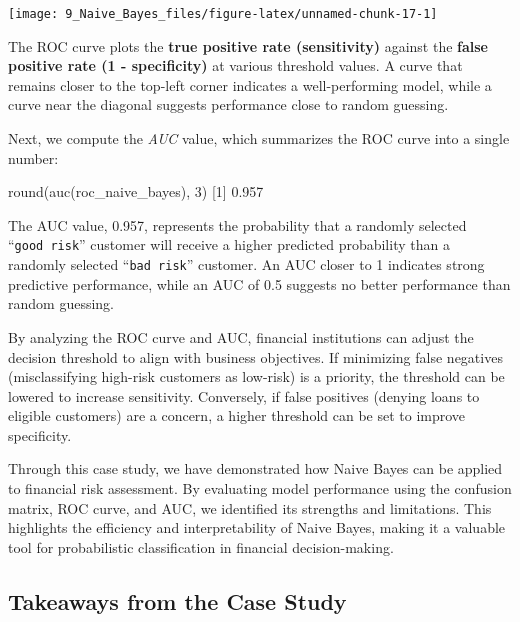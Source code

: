 \documentclass[
  11pt,
]{book}
\makeatletter
\newenvironment{Shaded}{}{}
\newcommand{\DecValTok}[1]{#1}
\newcommand{\FloatTok}[1]{#1}
\newcommand{\FunctionTok}[1]{#1}
\newcommand{\NormalTok}[1]{#1}
\newenvironment{kframe}{%
\medskip{}
\setlength{\fboxsep}{.8em}
 \def\at@end@of@kframe{}%
 \ifinner\ifhmode%
  \def\at@end@of@kframe{\end{minipage}}%
  \begin{minipage}{\columnwidth}%
 \fi\fi%
 \def\FrameCommand##1{\hskip\@totalleftmargin \hskip-\fboxsep
 \colorbox{shadecolor}{##1}\hskip-\fboxsep
     \hskip-\linewidth \hskip-\@totalleftmargin \hskip\columnwidth}%
 \MakeFramed {\advance\hsize-\width
   \@totalleftmargin\z@ \linewidth\hsize
   \@setminipage}}%
 {\par\unskip\endMakeFramed%
 \at@end@of@kframe}
\renewenvironment{Shaded}{\begin{kframe}}{\end{kframe}}
\theoremstyle{definition}
\theoremstyle{definition}
\theoremstyle{definition}
\theoremstyle{definition}
\theoremstyle{remark}
\makeatother
\begin{document}
\begin{center}\texttt{[image: 9\_Naive\_Bayes\_files/figure-latex/unnamed-chunk-17-1]} \end{center}

The ROC curve plots the \textbf{true positive rate (sensitivity)} against the \textbf{false positive rate (1 - specificity)} at various threshold values. A curve that remains closer to the top-left corner indicates a well-performing model, while a curve near the diagonal suggests performance close to random guessing.

Next, we compute the \emph{AUC} value, which summarizes the ROC curve into a single number:

\begin{Shaded}
\begin{Highlighting}[]
\FunctionTok{round}\NormalTok{(}\FunctionTok{auc}\NormalTok{(roc\_naive\_bayes), }\DecValTok{3}\NormalTok{)}
\NormalTok{   [}\DecValTok{1}\NormalTok{] }\FloatTok{0.957}
\end{Highlighting}
\end{Shaded}

The AUC value, 0.957, represents the probability that a randomly selected ``\texttt{good\ risk}'' customer will receive a higher predicted probability than a randomly selected ``\texttt{bad\ risk}'' customer. An AUC closer to 1 indicates strong predictive performance, while an AUC of 0.5 suggests no better performance than random guessing.

By analyzing the ROC curve and AUC, financial institutions can adjust the decision threshold to align with business objectives. If minimizing false negatives (misclassifying high-risk customers as low-risk) is a priority, the threshold can be lowered to increase sensitivity. Conversely, if false positives (denying loans to eligible customers) are a concern, a higher threshold can be set to improve specificity.

Through this case study, we have demonstrated how Naive Bayes can be applied to financial risk assessment. By evaluating model performance using the confusion matrix, ROC curve, and AUC, we identified its strengths and limitations. This highlights the efficiency and interpretability of Naive Bayes, making it a valuable tool for probabilistic classification in financial decision-making.

\subsection*{Takeaways from the Case Study}\label{takeaways-from-the-case-study}
\end{document}
